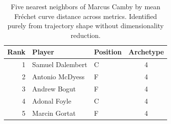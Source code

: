 \begin{table}[htbp]
  \centering\small
  \begin{tabular}{rllc}
    \toprule
    Rank & Player & Position & Archetype \\
    \midrule
    1 & Samuel Dalembert & C & 4 \\
    2 & Antonio McDyess & F & 4 \\
    3 & Andrew Bogut & F & 4 \\
    4 & Adonal Foyle & C & 4 \\
    5 & Marcin Gortat & F & 4 \\
    \bottomrule
  \end{tabular}
  \caption{Five nearest neighbors of Marcus Camby by mean Fr\'{e}chet curve distance across metrics. Identified purely from trajectory shape without dimensionality reduction.}
  \label{tab:Marcus_Camby_frechet_curve_neighbors}
\end{table}

